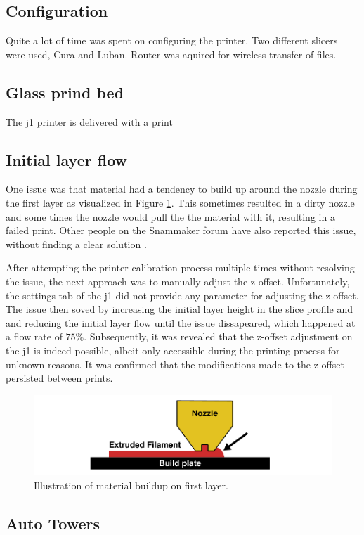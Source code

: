 \subsection{Configuration}
Quite a lot of time was spent on configuring the printer.
Two different slicers were used, Cura and Luban.
Router was aquired for wireless transfer of files.

\subsection{Glass prind bed}
The \gls{j1} printer is delivered with a print


\subsection{Initial layer flow}
One issue was that material had a tendency to build up around the nozzle during the first layer as visualized in Figure \ref{fig:first_layer_buildup}.
This sometimes resulted in a dirty nozzle and some times the nozzle would pull the the material with it, resulting in a failed print.
Other people on the Snammaker forum have also reported this issue, without finding a clear solution \cite{artezioFinerAdjustmentsOffset2021} \cite{napsZHeightCalibrationOffset2023}.

After attempting the printer calibration process multiple times without resolving the issue, the next approach was to manually adjust the z-offset.
Unfortunately, the settings tab of the \gls{j1} did not provide any parameter for adjusting the z-offset.
The issue then soved by increasing the initial layer height in the slice profile and and reducing the initial layer flow until the issue dissapeared, which happened at a flow rate of $75\%$.
Subsequently, it was revealed that the z-offset adjustment on the \gls{j1} is indeed possible, albeit only accessible during the printing process for unknown reasons.
It was confirmed that the modifications made to the z-offset persisted between prints.



\begin{figure}[H]
    \centering
    \includegraphics[width=\textwidth]{figures/3d_print/first_layer_buildup.pdf}
    \caption{Illustration of material buildup on first layer.}
    \label{fig:first_layer_buildup}
\end{figure}


\subsection{Auto Towers}
\cite{kartchnerAutoTowersGeneratorUltimaker2022}